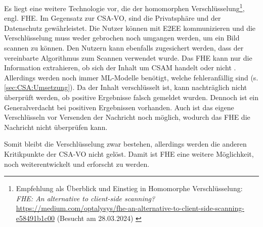 Es liegt eine weitere Technologie vor, die der homomorphen Verschlüsselung\footnote{Empfehlung als Überblick und Einstieg in Homomorphe Verschlüsselung: \textit{FHE: An alternative to client-side scanning?} \url{ https://medium.com/optalysys/fhe-an-alternative-to-client-side-scanning-e58491b1c00} (Besucht am 28.03.2024) \cite{wilson:2023:fhe}}, engl. \ac{FHE}. Im Gegensatz zur \ac{CSA-VO}, sind die Privatsphäre und der Datenschutz gewährleistet. Die Nutzer können mit \ac{E2EE} kommunizieren und die Verschlüsselung muss weder gebrochen noch umgangen werden, um ein Bild scannen zu können. Den Nutzern kann ebenfalls zugesichert werden, dass der vereinbarte Algorithmus zum Scannen verwendet wurde. Das \ac{FHE} kann nur die Information extrahieren, ob sich der Inhalt um \ac{CSAM} handelt oder nicht \cite{wilson:2023:fhe}. Allerdings werden noch immer \ac{ML}-Modelle benötigt, welche fehleranfällig sind (s. \autoref{sec:CSA:Umsetzung}). Da der Inhalt verschlüsselt ist, kann nachträglich nicht überprüft werden, ob positive Ergebnisse falsch gemeldet wurden. Dennoch ist ein Generalverdacht bei positiven Ergebnissen vorhanden. Auch ist das eigene Verschlüsseln vor Versenden der Nachricht noch möglich, wodurch das \ac{FHE} die Nachricht nicht überprüfen kann.

Somit bleibt die Verschlüsselung zwar bestehen, allerdings werden die anderen Kritikpunkte der \ac{CSA-VO} nicht gelöst. Damit ist \ac{FHE} eine weitere Möglichkeit, noch weiterentwickelt und erforscht zu werden.

